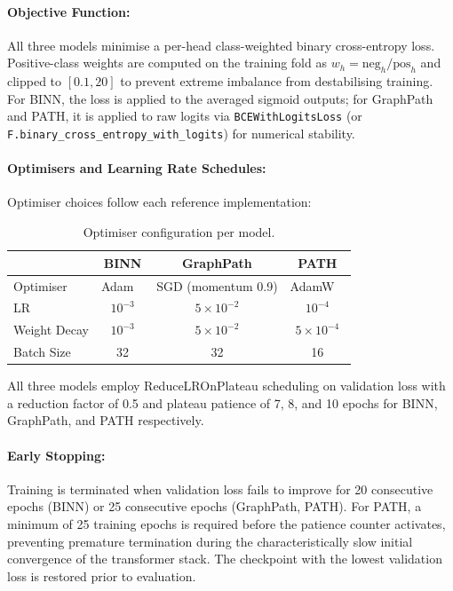 \documentclass[sigconf]{acmart}
\begin{document}
\paragraph{Objective Function:}
All three models minimise a per-head class-weighted binary cross-entropy loss. Positive-class weights are computed on the training fold as $w_h = \text{neg}_h / \text{pos}_h$ and clipped to $[0.1, 20]$ to prevent extreme imbalance from destabilising training. For BINN, the loss is applied to the averaged sigmoid outputs; for GraphPath and PATH, it is applied to raw logits via \texttt{BCEWithLogitsLoss} (or \texttt{F.binary\_cross\_entropy\_with\_logits}) for numerical stability.

\paragraph{Optimisers and Learning Rate Schedules:}
Optimiser choices follow each reference implementation:

\begin{table}[!h]
\centering
\small
\caption{Optimiser configuration per model.}
\label{tab:optimisers}
\begin{tabular}{lccc}
\toprule
 & BINN & GraphPath & PATH \\
\midrule
Optimiser    & Adam ~\cite{kingma2015adam}     & SGD (momentum 0.9)  & AdamW ~\cite{loshchilov2019adamw} \\
LR           & $10^{-3}$ & $5 \times 10^{-2}$  & $10^{-4}$ \\
Weight Decay & $10^{-3}$ & $5 \times 10^{-2}$  & $5 \times 10^{-4}$ \\
Batch Size   & 32        & 32                  & 16 \\
\bottomrule
\end{tabular}
\end{table}

All three models employ ReduceLROnPlateau scheduling on validation
loss with a reduction factor of 0.5 and plateau patience of 7, 8, and
10 epochs for BINN, GraphPath, and PATH respectively.

\paragraph{Early Stopping:}
Training is terminated when validation loss fails to improve for 20
consecutive epochs (BINN) or 25 consecutive epochs (GraphPath, PATH).
For PATH, a minimum of 25 training epochs is required before the
patience counter activates, preventing premature termination during
the characteristically slow initial convergence of the transformer
stack. The checkpoint with the lowest validation loss is restored
prior to evaluation.
\end{document}
